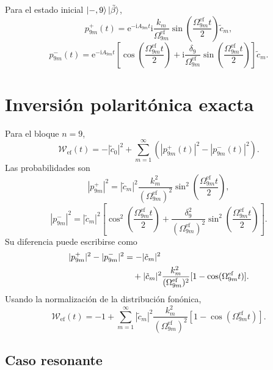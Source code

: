 \documentclass[11pt]{article}
\newcommand{\ii}{\mathrm{i}}
\newcommand{\ee}{\mathrm{e}}
\begin{document}
Para el estado inicial $\ket{-,9}\ket{\tilde\beta}$,
\begin{equation}
  \boxed{
  p_{9m}^+(t)
  =
  \ee^{-\ii A_{9m}t}
  \ii\frac{k_m}{\Omega_{9m}^{\mathrm{ef}}}
  \sin\left(\frac{\Omega_{9m}^{\mathrm{ef}}t}{2}\right)\tilde c_m,
  }
\end{equation}
\begin{equation}
  \boxed{
  p_{9m}^-(t)
  =
  \ee^{-\ii A_{9m}t}
  \left[
  \cos\left(\frac{\Omega_{9m}^{\mathrm{ef}}t}{2}\right)
  +
  \ii\frac{\delta_9}{\Omega_{9m}^{\mathrm{ef}}}
  \sin\left(\frac{\Omega_{9m}^{\mathrm{ef}}t}{2}\right)
  \right]\tilde c_m.
  }
\end{equation}

\section{Inversi\'on polarit\'onica exacta}

Para el bloque $n=9$,
\begin{equation}
  \mathcal W_{\mathrm{ef}}(t)
  =
  -|\tilde c_0|^2
  +
  \sum_{m=1}^{\infty}
  \left(|p_{9m}^+(t)|^2-|p_{9m}^-(t)|^2\right).
\end{equation}
Las probabilidades son
\begin{equation}
  |p_{9m}^+|^2
  =
  |\tilde c_m|^2
  \frac{k_m^2}{(\Omega_{9m}^{\mathrm{ef}})^2}
  \sin^2\left(\frac{\Omega_{9m}^{\mathrm{ef}}t}{2}\right),
\end{equation}
\begin{equation}
  |p_{9m}^-|^2
  =
  |\tilde c_m|^2
  \left[
  \cos^2\left(\frac{\Omega_{9m}^{\mathrm{ef}}t}{2}\right)
  +
  \frac{\delta_9^2}{(\Omega_{9m}^{\mathrm{ef}})^2}
  \sin^2\left(\frac{\Omega_{9m}^{\mathrm{ef}}t}{2}\right)
  \right].
\end{equation}
Su diferencia puede escribirse como
\begin{align}
  |p_{9m}^+|^2-|p_{9m}^-|^2
  &=
  -|\tilde c_m|^2
  \notag\\
  &\quad+
  |\tilde c_m|^2
  \frac{k_m^2}{(\Omega_{9m}^{\mathrm{ef}})^2}
  [1-\cos(\Omega_{9m}^{\mathrm{ef}}t)].
\end{align}
Usando la normalizaci\'on de la distribuci\'on fon\'onica,
\begin{equation}
  \boxed{
  \mathcal W_{\mathrm{ef}}(t)
  =
  -1+
  \sum_{m=1}^{\infty}
  |\tilde c_m|^2
  \frac{k_m^2}{(\Omega_{9m}^{\mathrm{ef}})^2}
  [1-\cos(\Omega_{9m}^{\mathrm{ef}}t)].
  }
\end{equation}

\subsection{Caso resonante}
\end{document}
